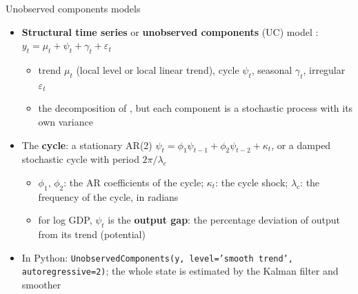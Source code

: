 \begin{frame}{Unobserved components models}
\itemsize{\small}
\begin{itemize}
    \item \textbf{Structural time series} or \textbf{unobserved components} (UC) model : $y_t = \mu_t + \psi_t + \gamma_t + \varepsilon_t$
    \begin{itemize}
        \item trend $\mu_t$ (local level or local linear trend), cycle $\psi_t$, seasonal $\gamma_t$, irregular $\varepsilon_t$
        \item the decomposition of , but each component is a stochastic process with its own variance
    \end{itemize}
    \item The \textbf{cycle}: a stationary AR(2) $\psi_t = \phi_1\psi_{t-1} + \phi_2\psi_{t-2} + \kappa_t$, or a damped stochastic cycle with period $2\pi/\lambda_c$
    \begin{itemize}
        \item $\phi_1$, $\phi_2$: the AR coefficients of the cycle; $\kappa_t$: the cycle shock; $\lambda_c$: the frequency of the cycle, in radians
        \item for log GDP, $\psi_t$ is the \textbf{output gap}: the percentage deviation of output from its trend (potential)
    \end{itemize}
    \item In Python: \texttt{UnobservedComponents(y, level='smooth trend', autoregressive=2)}; the whole state is estimated by the Kalman filter and smoother
\end{itemize}
\end{frame}

